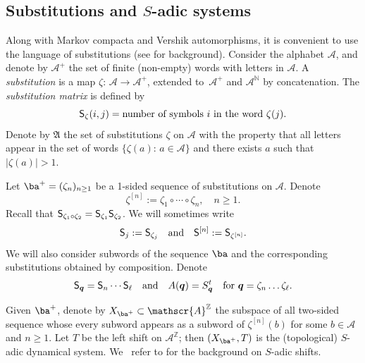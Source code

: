 \documentclass[JEP,XML,SOM,Unicode]{cedram}
\let\mathcal\mathscr
\theoremstyle{plain}
\theoremstyle{definition}
\newcommand\bq{{\boldsymbol q}}
\newcommand\FrA{\mathfrak{A}}
\newcommand\Ak{\mathcal{A}}
\newcommand\A{\mathcal{A}}
\newcommand{\Z}{\mathbb{Z}}
\newcommand{\N}{\mathbb{N}}
\newcommand\Sf{{\sf S}}
\newcommand\be{\begin{equation}}
\newcommand\ee{\end{equation}}
\begin{document}
\subsection{Substitutions and $S$-adic systems} \label{sec-Sadic}
Along with Markov compacta and Vershik automorphisms, it is convenient to use the language of {substitutions} (see \cite{Queff,Fogg} for background). Consider the
alphabet $\Ak$, and denote by $\Ak^+$ the set of finite (non-empty) words with letters in $\Ak$. A \emph{substitution} is a map $\zeta:\,\A\to \A^+$, extended to~$\A^+$ and $\A^{\N}$ by concatenation.
The \emph{substitution matrix} is defined by
\be \label{sub-mat}
\Sf_\zeta (i,j) = \text{number of symbols}\ i\ \text{in the word}\ \zeta(j).
\ee
Denote by $\FrA$ the set of substitutions $\zeta$ on $\Ak$ with the property that all letters appear in the set of words $\{\zeta(a):\,a\in \Ak\}$ and there exists $a$ such that $|\zeta(a)|>1$.

Let $\ba^+ =(\zeta_n)_{n\ge 1}$ be a 1-sided sequence of substitutions on $\Ak$. Denote
\[
\zeta^{[n]} := \zeta_1\circ \cdots\circ\zeta_n,\quad n\ge 1.
\]
Recall that $\Sf_{\zeta_1\circ \zeta_2} = \Sf_{\zeta_1}\Sf_{\zeta_2}$.
We will sometimes write
\[
\Sf_j:= \Sf_{\zeta_j}\quad \text{and}\quad \Sf^{[n]}:= \Sf_{\zeta^{[n]}}.
\]
We will also consider subwords of the sequence $\ba$ and the corresponding substitutions obtained by composition. Denote
\be \label{notation1}
\Sf_\bq = \Sf_n\cdots \Sf_\ell\quad \text{and}\quad A(\bq) = S_\bq^t\quad \text{for }\bq = \zeta_{n}\ldots\zeta_{\ell}.
\ee

Given $\ba^+$, denote by $X_{\ba^+}\subset \Ak^\Z$ the subspace of all two-sided sequence whose every subword appears as a subword of
$\zeta^{[n]}(b)$ for some $b\in \Ak$ and $n\ge 1$. Let $T$ be the left shift on $\Ak^\Z$; then $(X_{\ba^+},T)$ is the (topological) $S$-adic dynamical system.
We~ refer to \cite{BD,BST_2019,BSTY} for the background on $S$-adic shifts.
\end{document}

